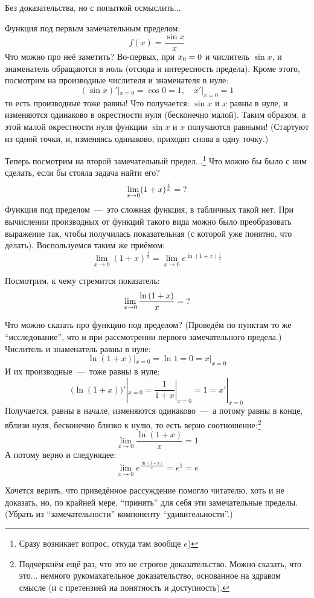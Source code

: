 \documentclass[a4paper,12pt]{article}
\begin{document}
  Без доказательства, но с попыткой осмыслить...

  \begin{remark}
    Функция под первым замечательным пределом:
    \[
      f(x) = \frac{\sin x}{x}
    \]
    Что можно про неё заметить?
    Во-первых, при $x_0 \hm= 0$ и числитель $\sin x$, и знаменатель обращаются в ноль (отсюда и интересность предела).
    Кроме этого, посмотрим на производные числителя и знаменателя в нуле:
    \[
      (\sin x)'|_{x = 0} = \cos 0 = 1,\quad x'|_{x = 0} = 1
    \]
    то есть производные тоже равны!
    Что получается: $\sin x$ и $x$ равны в нуле, и изменяются одинаково в окрестности нуля (бесконечно малой).
    Таким образом, в этой малой окрестности нуля функции $\sin x$ и $x$ получаются равными!
    (Стартуют из одной точки, и, изменяясь одинаково, приходят снова в одну точку.)
    \medskip

    Теперь посмотрим на второй замечательный предел...\footnote{
      Сразу возникает вопрос, откуда там вообще $e$)
    }
    Что можно бы было с ним сделать, если бы стояла задача найти его?
    \[
      \lim_{x \to 0} (1 + x)^{\frac{1}{x}} = \operatorname{?}
    \]
    Функция под пределом~---~это сложная функция, в табличных такой нет.
    При вычислении производных от функций такого вида можно было преобразовать выражение так, чтобы получилась показательная (с которой уже понятно, что делать).
    Воспользуемся таким же приёмом:
    \[
      \lim_{x \to 0} (1 + x)^{\frac{1}{x}}
        = \lim_{x \to 0} e^{\ln{(1 + x)} \frac{1}{x}}
    \]

    Посмотрим, к чему стремится показатель:
    \[
      \lim_{x \to 0} \frac{\ln{(1 + x)}}{x} = \operatorname{?}
    \]

    Что можно сказать про функцию под пределом?
    (Проведём по пунктам то же ``исследование'', что и при рассмотрении первого замечательного предела.)
    Числитель и знаменатель равны в нуле:
    \[
      \ln{(1 + x)}|_{x = 0} = \ln{1} = 0 = x|_{x = 0}
    \]
    И их производные~---~тоже равны в нуле:
    \[
      \bigl(\ln{(1 + x)}\bigr)'|_{x = 0} = \left.\frac{1}{1 + x}\right|_{x = 0} = 1 = x'|_{x = 0}
    \]
    Получается, равны в начале, изменяются одинаково~---~а потому равны в конце, вблизи нуля, бесконечно близко к нулю, то есть верно соотношение:\footnote{
      Подчеркнём ещё раз, что это не строгое доказательство.
      Можно сказать, что это... немного рукомахательное доказательство, основанное на здравом смысле (и с претензией на понятность и доступность).
    }
    \[
      \lim_{x \to 0} \frac{\ln{(1 + x)}}{x} = 1
    \]
    А потому верно и следующее:
    \[
      \lim_{x \to 0} e^{\frac{\ln{(1 + x)}}{x}} = e^1 = e
    \]

    \medskip

    Хочется верить, что приведённое рассуждение помогло читателю, хоть и не доказать, но, по крайней мере, ``принять'' для себя эти замечательные пределы.
    (Убрать из ``замечательности'' компоненту ``удивительности''.)
  \end{remark}
\end{document}
